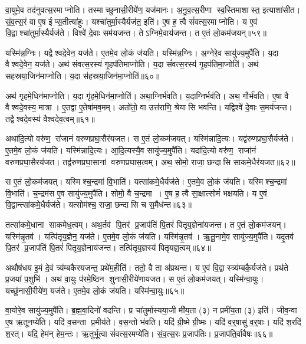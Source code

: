 वा॒युमे॒व तद॑नुवत्स॒रमाप्नोति।
तस्माच्छुनासी॒रीये॑ण॒ यज॑मानः।
अ॒नु॒व॒त्स॒रीणा स्व॒स्तिमाशास्त॒ इत्याशा॑सीत।
सं॒व॒त्स॒रं वा ए॒ष ईप्स॒तीत्या॑हुः।
यश्चा॑तुर्मा॒स्यैर्यज॑त॒ इति॑।
ए॒ष ह॒ त्वै सं॑वत्स॒रमाप्नोति।
य ए॒वं वि॒द्वाश्चा॑तुर्मा॒स्यैर्यज॑ते।
विश्वे॑ दे॒वाः सम॑यजन्त।
तेऽग्निमे॒वाय॑जन्त।
त ए॒तं लो॒कम॑जयन्॥५९॥

यस्मि॑न्न॒ग्निः।
यद्वैश्वदे॒वेन॒ यज॑ते।
ए॒तमे॒व लो॒कं ज॑यति।
यस्मि॑न्न॒ग्निः।
अ॒ग्नेरे॒व सायु॑ज्य॒मुपै॑ति।
य॒दा वैश्वदे॒वेन॒ यज॑ते।
अथ॑ संवत्स॒रस्य॑ गृ॒हप॑तिमाप्नोति।
य॒दा सं॑वत्स॒रस्य॑ गृ॒हप॑तिमा॒प्नोति॑।
अथ॑ सहस्रया॒जिन॑माप्नोति।
य॒दा स॑हस्रया॒जिन॑मा॒प्नोति॑॥६०॥

अथ॑ गृहमे॒धिन॑माप्नोति।
य॒दा गृ॑हमे॒धिन॑मा॒प्नोति॑।
अथा॒ग्निर्भ॑वति।
य॒दाग्निर्भव॑ति।
अथ॒ गौर्भ॑वति।
ए॒षा वै वैश्वदे॒वस्य॒ मात्रा।
ए॒तद्वा ए॒तेषा॑मव॒मम्।
अतो॑तो॒ वा उत्त॑राणि॒ श्रेयासि भवन्ति।
यद्विश्वे॑ दे॒वाः स॒मय॑जन्त।
तद्वैश्वदे॒वस्य॑ वैश्वदेव॒त्वम्॥६१॥

अथा॑दि॒त्यो वरु॑ण॒ रा॑जानं वरुणप्रघा॒सैर॑यजत।
स ए॒तं लो॒कम॑जयत्।
यस्मि॑न्नादि॒त्यः।
यद्व॑रुणप्रघा॒सैर्यज॑ते।
ए॒तमे॒व लो॒कं ज॑यति।
यस्मि॑न्नादि॒त्यः।
आ॒दि॒त्यस्यै॒व सायु॑ज्य॒मुपै॑ति।
यदा॑दि॒त्यो वरु॑ण॒ राजा॑नं वरुणप्रघा॒सै\-रय॑जत।
तद्व॑रुणप्रघा॒सानां वरुणप्रघास॒त्वम्।
अथ॒ सोमो॒ राजा॒ छन्दासि साकमे॒धैर॑यजत॥६२॥

स ए॒तं लो॒कम॑जयत्।
यस्मिश्च॒न्द्रमा॑ वि॒भाति॑।
यत्सा॑कमे॒धैर्यज॑ते।
ए॒तमे॒व लो॒कं ज॑यति।
यस्मिश्च॒न्द्रमा॑ वि॒भाति॑।
च॒न्द्रम॑स ए॒व सायु॑ज्य॒मुपै॑ति।
सोमो॒ वै च॒न्द्रमा।
ए॒ष ह॒ त्वै सा॒क्षात्सोमं॑ भक्षयति।
य ए॒वं वि॒द्वान्त्सा॑कमे॒धैर्यज॑ते।
यत्सोम॑श्च॒ राजा॒ छन्दासि च स॒मैध॑न्त॥६३॥

तत्सा॑कमे॒धाना साकमेध॒त्वम्।
अथ॒र्तव॑ पि॒तर॑ प्र॒जाप॑तिं पि॒तरं॑ पितृय॒ज्ञेना॑यजन्त।
त ए॒तं लो॒कम॑जयन्।
यस्मि॑न्नृ॒तव॑।
यत्पि॑तृय॒ज्ञेन॒ यज॑ते।
ए॒तमे॒व लो॒कं ज॑यति।
यस्मि॑न्नृ॒तव॑।
ऋ॒तू॒नामे॒व सायु॑ज्य॒मुपै॑ति।
यदृ॒तव॑ पि॒तर॑ प्र॒जाप॑तिं पि॒तरं॑ पितृय॒ज्ञेनाय॑जन्त।
तत्पि॑तृय॒ज्ञस्य॑ पितृयज्ञ॒त्वम्॥६४॥

अथौष॑धय इ॒मं दे॒वं त्र्य॑म्बकैरयजन्त॒ प्रथे॑म॒हीति॑।
ततो॒ वै ता अ॑प्रथन्त।
य ए॒वं वि॒द्वास्त्र्य॑म्बकै॒र्यज॑ते।
प्रथ॑ते प्र॒जया॑ प॒शुभि॑।
अथ॑ वा॒युः प॑रमे॒ष्ठिन शुनासी॒रीये॑णायजत।
स ए॒तं लो॒कम॑जयत्।
यस्मि॑न्वा॒युः।
यच्छु॑नासी॒रीये॑ण॒ यज॑ते।
ए॒तमे॒व लो॒कं ज॑यति।
यस्मि॑न्वा॒युः॥६५॥

वा॒योरे॒व सायु॑ज्य॒मुपै॑ति।
ब्र॒ह्म॒वा॒दिनो॑ वदन्ति।
प्र चा॑तुर्मास्यया॒जी मी॑य॒ता (३) न प्रमी॑य॒ता (३) इति॑।
जीव॒न्वा ए॒ष ऋ॒तूनप्ये॑ति।
यदि॑ व॒सन्ता प्र॒मीय॑ते।
व॒स॒न्तो भ॑वति।
यदि॑ ग्री॒ष्मे ग्री॒ष्मः।
यदि॑ व॒र्॒षासु॑ व॒र्॒षाः।
यदि॑ श॒रदि॑ श॒रत्।
यदि॒ हेम॑न् हेम॒न्तः।
ऋ॒तुर्भू॒त्वा सं॑वत्स॒रमप्ये॑ति।
सं॒व॒त्स॒रः प्र॒जाप॑तिः।
प्र॒जाप॑ति॒र्वावैषः॥६६॥






